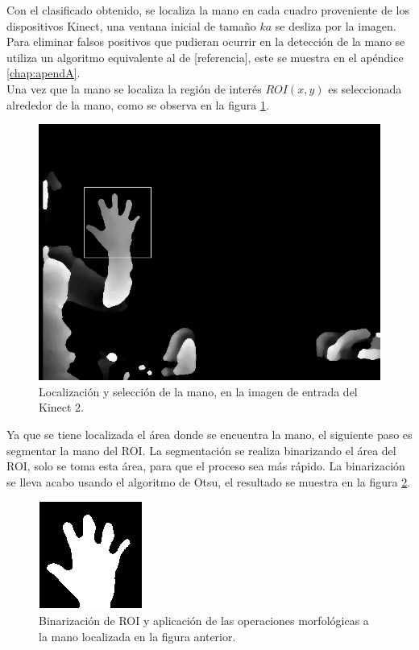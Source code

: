 Con el clasificado obtenido, se localiza la mano en cada cuadro proveniente de los dispositivos  Kinect, una ventana  inicial de tamaño $ka$ se desliza por la imagen. Para eliminar falsos positivos que pudieran ocurrir en la detección de la mano se utiliza un algoritmo equivalente al de [referencia], este se muestra en el apéndice \ref{chap:apendA}.\\ 
Una vez que la mano se localiza la región de interés $ROI(x,y)$ es seleccionada alrededor de la mano, como se observa en la figura \ref{fig:Roi}.

\begin{figure}[h!]
\begin{center}
\includegraphics[scale=.35]{./Figures/DS_252.png}
\end{center}
\caption{Localización y selección de la mano, en la imagen de entrada del Kinect 2.}
\label{fig:Roi}
\end{figure}  

Ya que se tiene localizada el área donde se encuentra la mano, el siguiente paso es segmentar la mano del ROI. La segmentación se realiza binarizando el área del ROI, solo se toma esta área, para que el proceso sea más rápido. La binarizaci\'on se lleva acabo usando el algoritmo de Otsu, el resultado se muestra en la figura \ref{fig:BinarizationRoi}. 
  
\begin{figure}[h!]
\begin{center}
\includegraphics[scale=1]{./Figures/250B_Otsu.png}
\end{center}
\caption{Binarización de ROI y aplicación de las operaciones morfológicas a la mano localizada en la figura anterior.}
\label{fig:BinarizationRoi}
\end{figure} 

